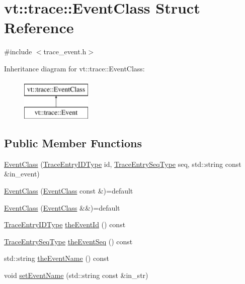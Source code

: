\hypertarget{structvt_1_1trace_1_1_event_class}{}\section{vt\+:\+:trace\+:\+:Event\+Class Struct Reference}
\label{structvt_1_1trace_1_1_event_class}


{\ttfamily \#include $<$trace\+\_\+event.\+h$>$}

Inheritance diagram for vt\+:\+:trace\+:\+:Event\+Class\+:\begin{figure}[H]
\begin{center}
\leavevmode
\includegraphics[height=2.000000cm]{structvt_1_1trace_1_1_event_class}
\end{center}
\end{figure}
\subsection*{Public Member Functions}
\begin{DoxyCompactItemize}
\item 
\hyperlink{structvt_1_1trace_1_1_event_class_ac9ec736933394fb09a42abf600d691a8}{Event\+Class} (\hyperlink{namespacevt_1_1trace_a3c14050715ba9eceaeff51fb3de64f2f}{Trace\+Entry\+I\+D\+Type} id, \hyperlink{namespacevt_1_1trace_a522028dd2a7d056f0ec3d417836fdecd}{Trace\+Entry\+Seq\+Type} seq, std\+::string const \&in\+\_\+event)
\item 
\hyperlink{structvt_1_1trace_1_1_event_class_a50a0237b8fa6d512720b3aa3830ae30a}{Event\+Class} (\hyperlink{structvt_1_1trace_1_1_event_class}{Event\+Class} const \&)=default
\item 
\hyperlink{structvt_1_1trace_1_1_event_class_ad33692ab53379c2fa9b54a9b8d389c69}{Event\+Class} (\hyperlink{structvt_1_1trace_1_1_event_class}{Event\+Class} \&\&)=default
\item 
\hyperlink{namespacevt_1_1trace_a3c14050715ba9eceaeff51fb3de64f2f}{Trace\+Entry\+I\+D\+Type} \hyperlink{structvt_1_1trace_1_1_event_class_a52d377fa9d26030bb55af4542cedcac4}{the\+Event\+Id} () const
\item 
\hyperlink{namespacevt_1_1trace_a522028dd2a7d056f0ec3d417836fdecd}{Trace\+Entry\+Seq\+Type} \hyperlink{structvt_1_1trace_1_1_event_class_a1bcdfd92ebe57e35dc740550c33fa831}{the\+Event\+Seq} () const
\item 
std\+::string \hyperlink{structvt_1_1trace_1_1_event_class_a471707cbfb7257528c3fa18bbaad485b}{the\+Event\+Name} () const
\item 
void \hyperlink{structvt_1_1trace_1_1_event_class_a853195e5cf52ac0214ff3863218bde81}{set\+Event\+Name} (std\+::string const \&in\+\_\+str)
\end{DoxyCompactItemize}
